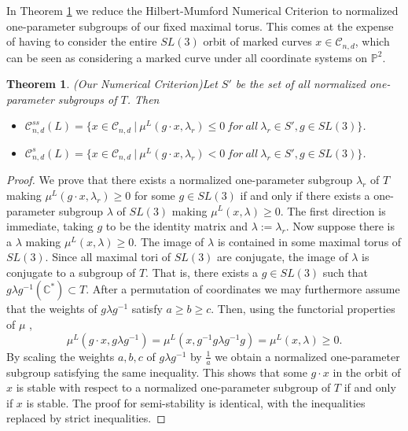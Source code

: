 \documentclass{amsart}
\newcommand{\C}{\mathbb{C}}
\newcommand{\Pj}{\mathbb{P}}
\newcommand{\mc}{\mathcal}
\numberwithin{equation}{section}
\newtheorem{thm}[prop]{Theorem}
\theoremstyle{definition}
\begin{document}
In Theorem \ref{theorem:NC} we reduce the Hilbert-Mumford Numerical Criterion to normalized one-parameter subgroups of our fixed maximal torus. This comes at the expense of having to consider the entire $SL(3)$ orbit of marked curves $x\in \mc{C}_{n,d}$, which can be seen as considering a marked curve under all coordinate systems on $\Pj^2$.
\begin{thm}{(Our Numerical Criterion)}\label{theorem:NC}
    Let $S'$ be the set of all normalized one-parameter subgroups of $T$. Then 
    \begin{itemize}
        \item $\mc{C}_{n,d}^{ss}(L) = \{ x \in \mc{C}_{n,d} \ | \ \mu^L(g \cdot x, \lambda_r ) \leq 0 \ for \ all \ \lambda_r \in S', g \in SL(3)  \}$.
            \item $\mc{C}_{n,d}^s(L) = \{ x \in \mc{C}_{n,d} \ | \ \mu^L(g \cdot x, \lambda_r ) < 0 \ for \ all \ \lambda_r \in S', g \in SL(3)  \}$.
    \end{itemize}
\end{thm}


\begin{proof}
    We prove that there exists a normalized one-parameter subgroup $\lambda_r$ of $T$ making $\mu^L(g \cdot x, \lambda_r) \geq 0$ for some $g \in SL(3)$ if and only if there exists a one-parameter subgroup $\lambda$ of $SL(3)$ making $\mu^L(x,\lambda) \geq 0$. The first direction is immediate, taking $g$ to be the identity matrix and $\lambda := \lambda_r$. Now suppose there is a $\lambda$ making $\mu^L(x,\lambda) \geq 0$. The image of $\lambda$ is contained in some maximal torus of $SL(3)$. Since all maximal tori of $SL(3)$ are conjugate, the image of $\lambda$ is conjugate to a subgroup of $T$. That is, there exists a $g \in SL(3)$ such that $g \lambda g^{-1}(\C^*) \subset T$. After a permutation of coordinates we may furthermore assume that the weights of $g \lambda g^{-1}$ satisfy $a \geq b \geq c$.
    Then, using the functorial properties of $\mu$ \cite[Definition 2.2]{Mum82},
    $$\mu^L(g \cdot x, g \lambda g^{-1}) = \mu^L(x, g^{-1}g \lambda g^{-1}g)= \mu^L(x, \lambda) \geq 0.  $$
    By scaling the weights $a,b,c$ of $g \lambda g^{-1}$ by $\frac{1}{a}$ we obtain a normalized one-parameter subgroup satisfying the same inequality. This shows that some $g \cdot x$ in the orbit of $x$ is stable with respect to a normalized one-parameter subgroup of $T$ if and only if $x$ is stable. The proof for semi-stability is identical, with the inequalities replaced by strict inequalities.
\end{proof}
\end{document}
